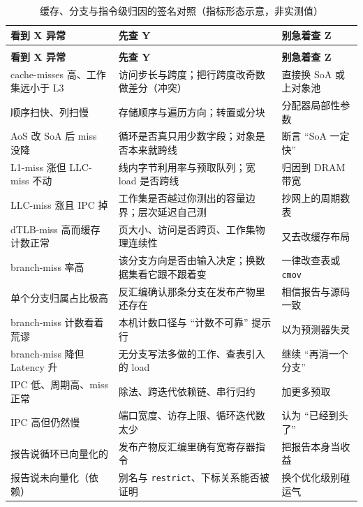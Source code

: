 \documentclass[12pt,a4paper,fontset=fandol]{ctexbook}
\newcommand{\Tp}[1]{\texttt{#1}}
\newcommand{\Bk}{\discretionary{}{}{}}
\newcommand{\Lang}[1]{\textsf{#1}}
\newcommand{\MLat}{\Lang{Latency}}
\newcommand{\Mx}[1]{\textsf{#1}}
\begin{document}
\begin{longtable}{|>{\raggedright\arraybackslash}p{}|>{\raggedright\arraybackslash}p{}|>{\raggedright\arraybackslash}p{}|}
\caption{缓存、分支与指令级归因的签名对照（指标形态示意，非实测值）}\label{tab:pm06-signature}\\
\hline
\textbf{看到 X 异常} & \textbf{先查 Y} & \textbf{别急着查 Z}\\
\hline
\endfirsthead
\hline
\multicolumn{3}{|l|}{表~\ref{tab:pm06-signature}~~缓存、分支与指令级归因的签名对照（续）}\\
\hline
\textbf{看到 X 异常} & \textbf{先查 Y} & \textbf{别急着查 Z}\\
\hline
\endhead
\hline
\endfoot
\hline
\endlastfoot
\Mx{cache{\Bk}-misses} 高、工作集远小于 L3 & 访问步长与跨度；把行跨度改奇数做差分（冲突） & 直接换 SoA 或上对象池\\
\hline
顺序扫快、列扫慢 & 存储顺序与遍历方向；转置或分块 & 分配器局部性参数\\
\hline
AoS 改 SoA 后 miss 没降 & 循环是否真只用少数字段；对象是否本来就跨线 & 断言 ``SoA 一定快''\\
\hline
\Mx{L1{\Bk}-miss} 涨但 \Mx{LLC{\Bk}-miss} 不动 & 线内字节利用率与预取队列；宽 load 是否跨线 & 归因到 DRAM 带宽\\
\hline
\Mx{LLC{\Bk}-miss} 涨且 \Mx{IPC} 掉 & 工作集是否越过你测出的容量边界；层次延迟自己测 & 抄网上的周期数表\\
\hline
\Mx{dTLB-miss} 高而缓存计数正常 & 页大小、访问是否跨页、工作集物理连续性 & 又去改缓存布局\\
\hline
\Mx{branch{\Bk}-miss} 率高 & 该分支方向是否由输入决定；换数据集看它跟不跟着变 & 一律改查表或 \Tp{cmov}\\
\hline
单个分支归属占比极高 & 反汇编确认那条分支在发布产物里还存在 & 相信报告与源码一致\\
\hline
\Mx{branch{\Bk}-miss} 计数看着荒谬 & 本机计数口径与 ``计数不可靠'' 提示行 & 以为预测器失灵\\
\hline
\Mx{branch{\Bk}-miss} 降但 \MLat{} 升 & 无分支写法多做的工作、查表引入的 load & 继续 ``再消一个分支''\\
\hline
\Mx{IPC} 低、周期高、miss 正常 & 除法、跨迭代依赖链、串行归约 & 加更多预取\\
\hline
\Mx{IPC} 高但仍然慢 & 端口宽度、访存上限、循环迭代数太少 & 认为 ``已经到头了''\\
\hline
报告说循环已向量化的 & 发布产物反汇编里确有宽寄存器指令 & 把报告本身当收益\\
\hline
报告说未向量化（依赖） & 别名与 \Tp{restrict}、下标关系能否被证明 & 换个优化级别碰运气\\

\end{longtable}
\end{document}
